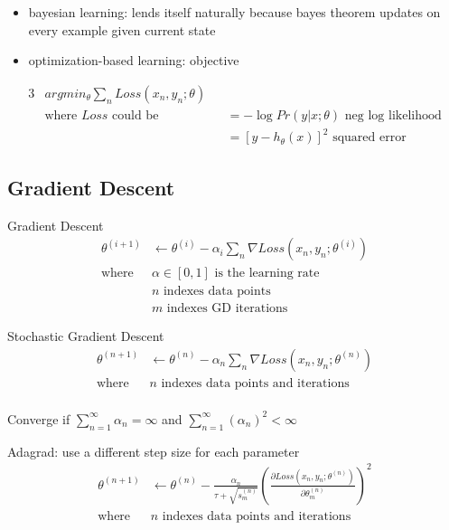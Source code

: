 \documentclass[]{article}
\theoremstyle{definition}
\begin{document}
\begin{itemize}
    \item bayesian learning: lends itself naturally because bayes theorem updates on every example given current state
    \item optimization-based learning: objective
\end{itemize}

\begin{alignat*}{3}
    & argmin_\theta \sum_n Loss(x_n, y_n; \theta) \\
    & \text{where } Loss \text{ could be} &&= - \log Pr(y|x;\theta) \text{ neg log likelihood} \\
    & &&= [y - h_\theta (x)]^2 \text{ squared error}
\end{alignat*}

\subsection{Gradient Descent}
\label{sub:gradient_descent}

Gradient Descent
\begin{align*}
    \theta^{(i+1)} & \gets \theta^{(i)} - \alpha_i \sum_n \nabla Loss(x_n, y_n; \theta^{(i)}) \\
    \text{where } & \alpha \in [0,1] \text{ is the learning rate} \\
    &n \text{ indexes data points} \\
    &m \text{ indexes GD iterations}
\end{align*}

Stochastic Gradient Descent
\begin{align*}
    \theta^{(n+1)} & \gets \theta^{(n)} - \alpha_n \sum_n \nabla Loss(x_n, y_n; \theta^{(n)}) \\
    \text{where } & n \text{ indexes data points and iterations} \\
\end{align*}

Converge if $\sum_{n=1}^\infty \alpha_n = \infty$ and $\sum_{n=1}^\infty (\alpha_n)^2 < \infty$

Adagrad: use a different step size for each parameter
\begin{align*}
    \theta^{(n+1)} & \gets \theta^{(n)} - \frac{\alpha_n}{\tau + \sqrt{s_m^{(n)}}} (\frac{\partial Loss(x_n, y_n; \theta^{(n)})}{\partial \theta_m^{(n)}})^2 \\
    \text{where } & n \text{ indexes data points and iterations} \\
\end{align*}
\end{document}
